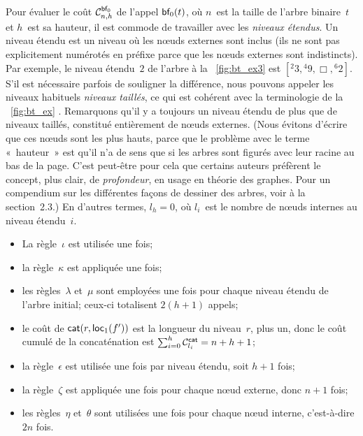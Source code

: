 Pour évaluer le coût
\(\C{\fun{bf}_0}{n,h}\) de l'appel
\(\fun{bf}_0(t)\), où \(n\)~est la taille de l'arbre binaire~\(t\) et
\(h\)~est sa hauteur, il est commode de
travailler avec les \emph{niveaux étendus}. Un niveau étendu est un niveau où les nœuds externes
sont inclus (ils ne sont pas explicitement numérotés en préfixe parce
que les nœuds externes sont indistincts). Par exemple, le niveau
étendu~\(2\) de l'arbre à la \fig~\vref{fig:bt_ex3} est \([{}^{2}{3},
{}^{4}{9}, \Box, {}^{6}{2}]\). S'il est nécessaire parfois de
souligner la différence, nous pouvons appeler les niveaux habituels
\emph{niveaux taillés}, ce qui est cohérent avec la terminologie de la
\fig~\ref{fig:bt_ex} . Remarquons qu'il y a
toujours un niveau étendu de plus que de niveaux taillés, constitué
entièrement de nœuds externes. (Nous évitons d'écrire que ces
nœuds sont les plus hauts, parce que le problème avec le terme
«~hauteur~» est qu'il n'a de sens que si les arbres
sont figurés avec leur racine au bas de la page. C'est peut-être pour
cela que certains auteurs préfèrent le concept, plus clair, de
\emph{profondeur}, en usage en théorie
des graphes. Pour un compendium sur les différentes façons de dessiner
des arbres, voir \cite{Knuth_1997} à la section~2.3.) En d'autres
termes, \(l_h=0\), où \(l_i\)~est le nombre de nœuds internes au
niveau étendu~\(i\).
\begin{itemize}

  \item La règle~\(\iota\) est utilisée une fois;

  \item la règle~\(\kappa\) est appliquée une fois;

  \item les règles~\(\lambda\) et~\(\mu\) sont employées une fois pour
    chaque niveau étendu de l'arbre initial; ceux-ci totalisent
    \(2(h+1)\) appels;

  \item le coût de \(\fun{cat}(r,\fun{loc}_1(f'))\) est la longueur du
    niveau~\(r\), plus un, donc le coût cumulé de la concaténation est
    \(\sum_{i=0}^{h}\C{\fun{cat}}{l_i} = n + h + 1\);

  \item la règle~\(\epsilon\) est utilisée une fois par niveau étendu,
    soit \(h+1\) fois;

  \item la règle~\(\zeta\) est appliquée une fois pour chaque nœud
    externe, donc \(n+1\) fois;

  \item les règles~\(\eta\) et~\(\theta\) sont utilisées une fois pour
    chaque nœud interne, c'est-à-dire \(2n\) fois.

\end{itemize}
